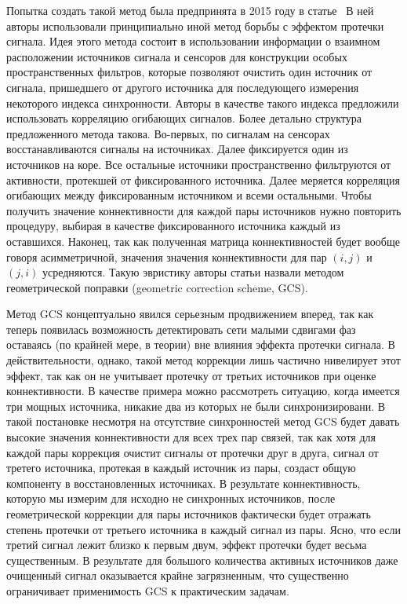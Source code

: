 Попытка создать такой метод была предпринята в 2015 году в
статье~\cite{Wens2015} В ней авторы использовали принципиально иной метод
борьбы с эффектом протечки сигнала.  Идея этого метода состоит в использовании
информации о взаимном расположении источников сигнала и сенсоров для
конструкции особых пространственных фильтров, которые позволяют очистить один
источник от сигнала, пришедшего от другого источника для последующего измерения
некоторого индекса синхронности. Авторы в качестве такого индекса предложили
использовать корреляцию огибающих сигналов. Более детально структура
предложенного метода такова. Во-первых, по сигналам на сенсорах
восстанавливаются сигналы на источниках.  Далее фиксируется один из источников
на коре.  Все остальные источники пространственно фильтруются от активности,
протекшей от фиксированного источника.  Далее меряется корреляция огибающих
между фиксированным источником и всеми остальными.  Чтобы получить значение
коннективности для каждой пары источников нужно повторить процедуру, выбирая в
качестве фиксированного источника каждый из оставшихся.  Наконец, так как
полученная матрица коннективностей будет вообще говоря асимметричной, значения
значения коннективности для пар $(i,j)$ и $(j,i)$ усредняются. Такую эвристику
авторы статьи назвали методом геометрической поправки (geometric correction
scheme, GCS).

Метод GCS концептуально явился серьезным продвижением вперед, так как теперь
появилась возможность детектировать сети малыми сдвигами фаз оставаясь (по
крайней мере, в теории) вне влияния эффекта протечки сигнала.  В
действительности, однако, такой метод коррекции лишь частично нивелирует этот
эффект, так как он не учитывает протечку от третьих источников при оценке
коннективности. В качестве примера можно рассмотреть ситуацию, когда имеется
три мощных источника, никакие два из которых не были синхронизировани.  В такой
постановке несмотря на отсутствие синхронностей метод GCS будет давать высокие
значения коннективности для всех трех пар связей, так как хотя для каждой пары
коррекция очистит сигналы от протечки друг в друга, сигнал от третего
источника, протекая в каждый источник из пары, создаст общую компоненту в
восстановленных источниках.  В результате коннективность, которую мы измерим
для исходно не синхронных источников, после геометрической коррекции для пары
источников фактически будет отражать степень протечки от третьего источника в
каждый сигнал из пары. Ясно, что если третий сигнал лежит близко к первым двум,
эффект протечки будет весьма существенным. В результате для большого количества
активных источников даже очищенный сигнал оказывается крайне загрязненным, что
существенно ограничивает применимость GCS к практическим задачам.



